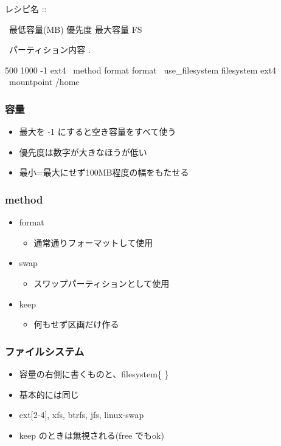 \documentclass[mingoth,a4paper]{jsarticle}
\begin{document}
レシピ名 ::

\ 最低容量(MB) 優先度 最大容量 FS

\ パーティション内容 .

\begin{commandline}
 500 1000 -1 ext4 \
 method{ format } format{ } \
 use_filesystem{ } filesystem{ ext4 } \
 mountpoint{ /home }
\end{commandline}

\subsubsection{容量}
\begin{itemize}
\item 最大を -1 にすると空き容量をすべて使う
\item 優先度は数字が大きなほうが低い
\item 最小=最大にせず100MB程度の幅をもたせる
\end{itemize}

\subsubsection{method}
\begin{itemize}
\item format
  \begin{itemize}
  \item 通常通りフォーマットして使用
  \end{itemize}
\item swap
  \begin{itemize}
  \item スワップパーティションとして使用
  \end{itemize}
\item keep
  \begin{itemize}
  \item 何もせず区画だけ作る
  \end{itemize}
\end{itemize}

\subsubsection{ファイルシステム}
\begin{itemize}
\item 容量の右側に書くものと、filesystem\{ \}
\item 基本的には同じ
\item ext[2-4], xfs, btrfs, jfs, linux-swap
\item keep のときは無視される(free でもok)
\end{itemize}
\end{document}
